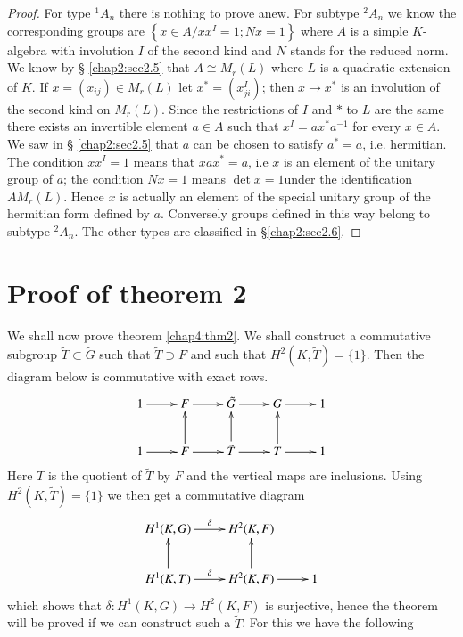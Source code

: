 \begin{proof}
For type ${}^1 A_n$ there is nothing to prove anew. For subtype ${}^2 A_n$
we know the corresponding groups are $\left\{ x \in A/ xx^I = 1; Nx =1
\right\}$ 
where $A$ is a simple $K$-algebra with involution $I$ of the second kind
and $N$ stands for the reduced norm. We know by \S
\ref{chap2:sec2.5} that $A \cong 
M_r (L)$ where $L$ is a quadratic extension of $K$. If $x = (x_{ij})
\in M_r (L)$ let $x^* = (x^I_{ji})$; then $x \to x^*$ is an involution
of the second kind on $M_r (L)$. Since the restrictions of $I$ and $*$
to $L$ are the same there exists an invertible element $a \in A$ such
that $x^I = ax^*a^{-1}$ for every $x \in A$. We saw in \S
\ref{chap2:sec2.5} that $a$ 
can be chosen to satisfy $a^* = a$, i.e. hermitian. The condition $xx^I
= 1$ means that $xax^* = a$, i.e $x$ is an element of the unitary group
of $a$; the condition $Nx = 1$ means $\det x = 1$\pageoriginale under the
identification $A M_r(L)$. Hence $x$ is actually an element of the
special unitary group of the hermitian form defined by $a$. Conversely
groups defined in this way belong to subtype ${}^2 A_n$. The other types
are classified in \S \ref{chap2:sec2.6}. 
\end{proof}

\section{Proof of theorem 2}\label{chap4:sec4.2}
We shall now prove theorem \ref{chap4:thm2}. We shall construct a commutative
subgroup $ \tilde{T} \subset \tilde{G}$ such that $\tilde{T} \supset
F$ and such that $H^2 (K, \tilde{T}) = \{ 1 \}$. Then the diagram
below is commutative with exact rows.  
\[
\xymatrix{
1 \ar[r] & F \ar[r] & \tilde{G} \ar[r] & G \ar[r] & 1 \\
1 \ar[r] & F \ar[r] \ar[u] & \tilde{T} \ar[r] \ar[u] & T \ar[r] \ar[u]
& 1
}
\]
Here $T$ is the quotient of $\tilde{T}$ by $F$ and the vertical maps
are inclusions. Using $H^2 (K, \tilde{T}) = \{ 1 \}$  we then get a
commutative diagram
\[
\xymatrix{
H^1 (K,G) \ar[r]^{\delta} & H^2 (K,F) & \\
H^1 (K,T) \ar[r]^{\delta} \ar[u] & H^2 (K,F) \ar[r] \ar[u] & 1
}
\]
which shows that $\delta : H^1(K,G) \to H^2(K,F)$ is surjective, hence
the theorem will be proved if we can construct such a $\tilde{T}$. For
this we have the following  


